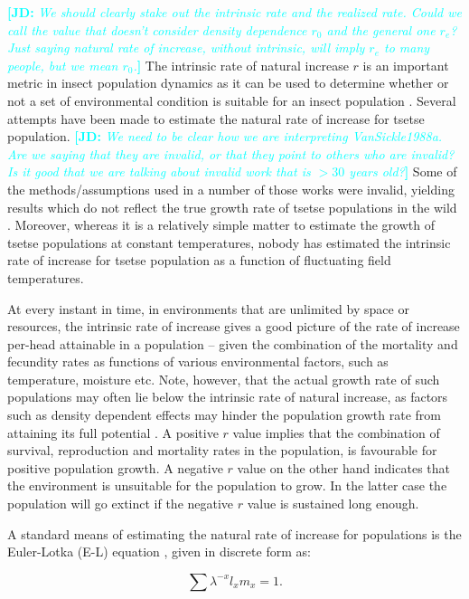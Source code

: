 \documentclass[12pt,a4paper]{article}
\newcommand{\comment}[3]{\textcolor{#1}{\textbf{[#2: }\textsl{#3}\textbf{]}}}
\newcommand{\jd}[1]{\comment{cyan}{JD}{#1}}
\begin{document}
\jd{We should clearly stake out the intrinsic rate and the realized rate. Could we call the value that doesn't consider density dependence $r_0$ and the general one $r_e$? Just saying natural rate of increase, without intrinsic, will imply $r_e$ to many people, but we mean $r_0$.}
The intrinsic rate of natural increase $r$ is an important metric in insect population dynamics as it can be used to determine whether or not a set of environmental condition is suitable for an insect population \cite{Birch1948}. Several attempts have been made to estimate the natural rate of increase for tsetse population. \jd{We need to be clear how we are interpreting VanSickle1988a. Are we saying that they are invalid, or that they point to others who are invalid? Is it good that we are talking about invalid work that is $>30$ years old?} Some of the methods/assumptions used in a number of those works were invalid, yielding results which do not reflect the true growth rate of tsetse populations in the wild \cite{VanSickle1988a}. Moreover, whereas it is a relatively simple matter to estimate the growth of tsetse populations at constant temperatures, nobody has estimated the intrinsic rate of increase for tsetse population as a function of fluctuating field temperatures.

At every instant in time, in environments that are unlimited by space or  resources, the intrinsic rate of increase gives a good picture of the rate of increase per-head  attainable in a population -- given the combination of  the mortality and fecundity rates as functions of various environmental factors, such as temperature, moisture etc. Note, however, that the actual growth rate of such populations may often lie below the intrinsic rate of natural increase, as factors such as density dependent effects may hinder the population growth rate from attaining its full potential \cite{Birch1948}. A positive $r$ value implies that the combination of survival, reproduction and  mortality rates in the population, is favourable for positive population growth. A negative $r$ value on the other hand indicates that the environment is unsuitable for the population to grow. In the latter case the population will go extinct if the negative $r$ value is sustained long enough.

A standard means of estimating the natural rate of increase for populations is the Euler-Lotka (E-L) equation \cite{Birch1948,Zidon2015}, given in discrete form as:

\begin{equation}
\label{equation3}
\sum \lambda^{-x}l_{x}m_{x} = 1.
\end{equation}
\end{document}
